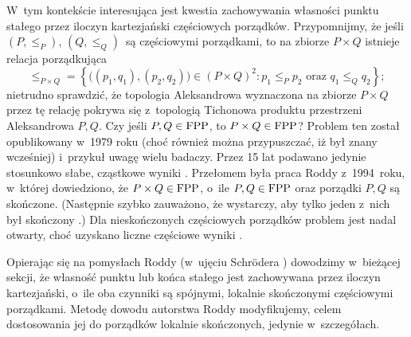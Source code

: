 W~tym kontekście interesująca jest kwestia zachowywania własności punktu stałego przez iloczyn kartezjański częściowych porządków. Przypomnijmy, że jeśli $(P,\leq_P)$, $(Q,\leq_Q)$~są częściowymi porządkami, to na zbiorze $P\times Q$ istnieje relacja porządkująca \[\leq_{P\times Q}=\left\{\bigl((p_1,q_1),(p_2,q_2)\bigr)\in (P\times Q)^2:p_1\leq_P p_2 \text{ oraz } q_1\leq_Q q_2\right\};\] nietrudno sprawdzić, że topologia Aleksandrowa wyznaczona na zbiorze $P\times Q$ przez tę relację pokrywa się z~topologią Tichonowa produktu przestrzeni Aleksandrowa $P,Q$. Czy jeśli $P,Q\in\mathrm{FPP}$, to $P\times Q\in\mathrm{FPP}$? Problem ten został opublikowany w~1979 roku \cite{Baclawski79} (choć również można przypuszczać, iż był znany wcześniej) i~przykuł uwagę wielu badaczy. Przez 15 lat podawano jedynie stosunkowo słabe, cząstkowe wyniki \cite{Duffus87,Rutkowski85,Rutkowski86,Walker84}. Przełomem była praca  Roddy \cite{Roddy94} z~1994~roku, w~której dowiedziono, że $P\times Q\in\mathrm{FPP}$, o~ile $P,Q\in\mathrm{FPP}$ oraz porządki $P,Q$ są skończone. (Następnie szybko zauważono, że wystarczy, aby tylko jeden z~nich był skończony \cite[Section 10.2.1]{Schroder03}.) Dla nieskończonych częściowych porządków problem jest nadal otwarty, choć uzyskano liczne częściowe wyniki \cite{Niederle07,Niederle08,Roddy02,Roddy05,Rutkowski94,Schroder95}.

Opierając się na pomysłach Roddy \cite{Roddy94} (w~ujęciu Schr{\"o}dera \cite[Subsection 10.2.1]{Schroder03}) dowodzimy w~bieżącej sekcji, że własność punktu lub końca stałego jest zachowywana przez iloczyn kartezjański, o~ile oba czynniki są spójnymi, lokalnie skończonymi częściowymi porządkami. Metodę dowodu autorstwa Roddy modyfikujemy, celem dostosowania jej do porządków lokalnie skończonych, jedynie w~szczegółach.

